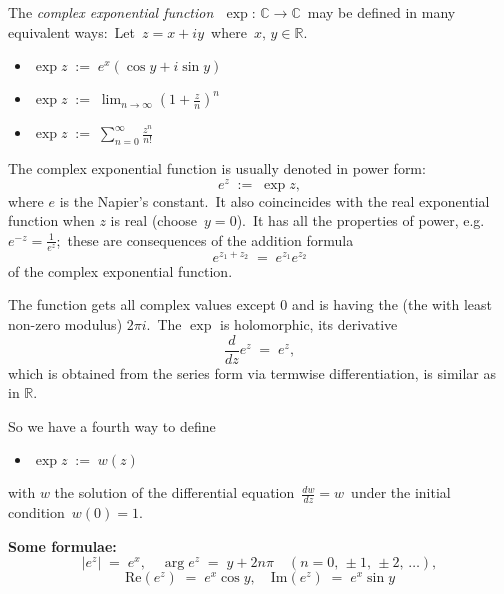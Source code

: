 \documentclass[12pt]{article}
\begin{document}
The {\em complex exponential function}\,\, $\exp:\,\mathbb{C}\to \mathbb{C}$\, may be defined in many equivalent ways:\, Let\, $z = x\!+\!iy$\, where\, $x,\,y\in\mathbb{R}$.
\begin{itemize}
 \item $\displaystyle\exp{z} \;:=\; e^x(\cos{y}+i\sin{y})$
 \item $\displaystyle\exp{z} \;:=\; \lim_{n\to\infty}\left(1+\frac{z}{n}\right)^n$
 \item $\displaystyle\exp{z} \;:=\; \sum_{n = 0}^\infty\frac{z^n}{n!}$
\end{itemize}
The complex exponential function is usually denoted in power form:
                          $$e^z \;:=\; \exp{z},$$
where $e$ is the Napier's constant.\, It also coincincides with the real exponential function when $z$ is real (choose\,  $y = 0$).\, It has  all the properties of power, e.g.\, $e^{-z} = \frac{1}{e^z}$;\, these are consequences of the addition formula
                     $$e^{z_1+z_2} \;=\; e^{z_1}e^{z_2}$$
of the complex exponential function.

The function gets all complex values except 0 and is  having the  (the  with least non-zero modulus) $2\pi i$.\, The $\exp$ is holomorphic, its derivative 
               $$\frac{d}{dz}e^z \;=\; e^z,$$
which is obtained from the series form via termwise differentiation, is similar as in $\mathbb{R}$.

So we have a fourth way to define 
\begin{itemize}
 \item $\exp{z} \;:=\; w(z)$ 
\end{itemize}
with $w$ the solution of the differential equation \,$\displaystyle\frac{dw}{dz} = w$\, under the initial condition\, $w(0) = 1$.

\textbf{Some formulae:}
 $$|e^z| \;=\; e^x, \quad \arg{e^z} \;=\; y+2n\pi\quad(n = 0,\,\pm1,\,\pm2,\,\ldots),$$
 $$\mbox{Re}(e^z) \;=\; e^x\cos{y}, \quad \mbox{Im}(e^z) \;=\; e^x\sin{y}$$
\end{document}
